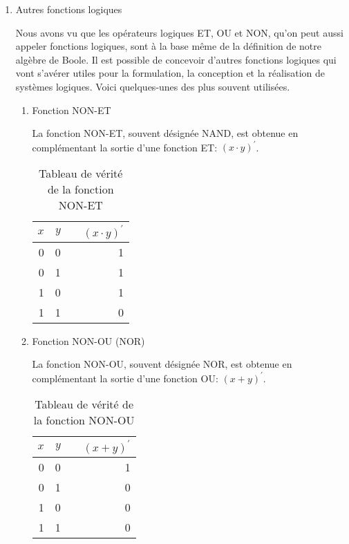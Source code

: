 \documentclass[letter, oneside]{book}
\begin{document}
\begin{enumerate}
\item Autres fonctions logiques
\label{sec:org94539ca}

Nous avons vu que les opérateurs logiques ET, OU et NON, qu'on peut
aussi appeler fonctions logiques, sont à la base même de la définition
de notre algèbre de Boole. Il est possible de concevoir d'autres
fonctions logiques qui vont s'avérer utiles pour la formulation, la
conception et la réalisation de systèmes logiques. Voici quelques-unes
des plus souvent utilisées.

\begin{enumerate}
\item Fonction NON-ET
\label{sec:orgc3311f9}

La fonction NON-ET, souvent désignée NAND, est obtenue en
complémentant la sortie d'une fonction ET: \((x \cdot y)^\prime\).

\begin{table}[htbp]
\caption{\label{tab:org2980461}Tableau de vérité de la fonction NON-ET}
\centering
\begin{tabular}{rrlr}
\(x\) & \(y\) &  & \((x \cdot y)^\prime\)\\[0pt]
\hline
0 & 0 &  & 1\\[0pt]
0 & 1 &  & 1\\[0pt]
1 & 0 &  & 1\\[0pt]
1 & 1 &  & 0\\[0pt]
\end{tabular}
\end{table}

\item Fonction NON-OU (NOR)
\label{sec:org459dc8b}

La fonction NON-OU, souvent désignée NOR, est obtenue en complémentant
la sortie d'une fonction OU: \((x + y)^\prime\).

\begin{table}[htbp]
\caption{\label{tab:org6c70e86}Tableau de vérité de la fonction NON-OU}
\centering
\begin{tabular}{rrlr}
\(x\) & \(y\) &  & \((x + y)^\prime\)\\[0pt]
\hline
0 & 0 &  & 1\\[0pt]
0 & 1 &  & 0\\[0pt]
1 & 0 &  & 0\\[0pt]
1 & 1 &  & 0\\[0pt]
\end{tabular}
\end{table}


\end{enumerate}
\end{enumerate}
\end{document}
